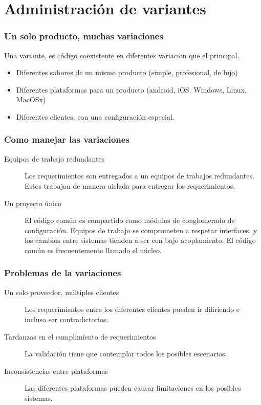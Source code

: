 \section{Administraci\'on de variantes}
\begin{frame}
	\frametitle{Un solo producto, muchas variaciones}
Una variante, es c\'odigo coexistente en diferentes variacion que el principal. 
	\begin{itemize}
		\item Diferentes \alert{sabores} de un mismo producto (simple, profesional, de lujo)
		\item Diferentes plataformas para un producto (android, iOS, Windows, Linux, MacOSx)
		\item Diferentes clientes, con una configuraci\'on especial. 
	\end{itemize}
\end{frame}

\begin{frame}
	\frametitle{Como manejar las variaciones}
	\begin{description}
		\item [Equipos de trabajo redundantes] Los requerimientos son entregados a un equipos de trabajos redundantes. 
			Estos trabajan de manera aislada para entregar los requerimientos.
		\item [Un proyecto \'unico] El c\'odigo com\'un es compartido como m\'odulos de conglomerado de configuraci\'on. 
			Equipos de trabajo se comprometen a respetar interfaces, y los cambios entre sistemas tienden a ser
			con bajo acoplamiento. El c\'odigo com\'un es frecuentemente llamado el n\'ucleo. 
			
	\end{description}
\end{frame}
\begin{frame}
	\frametitle{Problemas de la variaciones}
	\begin{description}
		\item [Un solo proveedor, m\'ultiples clientes] Los requerimientos entre los diferentes clientes pueden ir 
			difiriendo e incluso ser contradictorios. 
		\item [Tardanzas en el cumplimiento de requerimientos] La validaci\'on tiene que contemplar todos los 
			posibles escenarios. 
		\item [Inconsistencias entre plataformas] Las diferentes plataformas pueden causar limitaciones en 
			los posibles sistemas. 
	\end{description}
\end{frame}	
